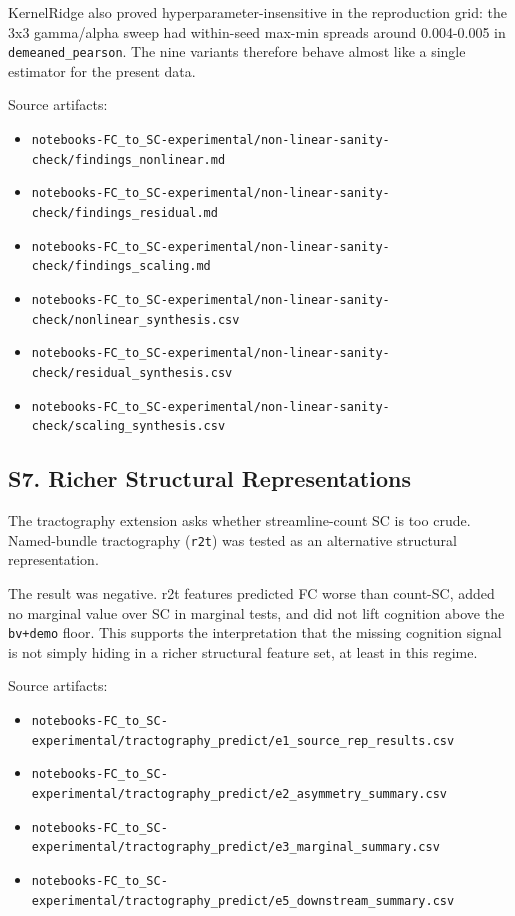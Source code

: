 KernelRidge also proved hyperparameter-insensitive in the reproduction grid: the 3x3 gamma/alpha sweep had within-seed max-min spreads around 0.004-0.005 in \texttt{demeaned\_pearson}. The nine variants therefore behave almost like a single estimator for the present data.

Source artifacts:

\begin{itemize}
\tightlist
\item
  \texttt{notebooks-FC\_to\_SC-experimental/non-linear-sanity-check/findings\_nonlinear.md}
\item
  \texttt{notebooks-FC\_to\_SC-experimental/non-linear-sanity-check/findings\_residual.md}
\item
  \texttt{notebooks-FC\_to\_SC-experimental/non-linear-sanity-check/findings\_scaling.md}
\item
  \texttt{notebooks-FC\_to\_SC-experimental/non-linear-sanity-check/nonlinear\_synthesis.csv}
\item
  \texttt{notebooks-FC\_to\_SC-experimental/non-linear-sanity-check/residual\_synthesis.csv}
\item
  \texttt{notebooks-FC\_to\_SC-experimental/non-linear-sanity-check/scaling\_synthesis.csv}
\end{itemize}

\subsection{S7. Richer Structural Representations}\label{s7-richer-structural-representations}

The tractography extension asks whether streamline-count SC is too crude. Named-bundle tractography (\texttt{r2t}) was tested as an alternative structural representation.

The result was negative. r2t features predicted FC worse than count-SC, added no marginal value over SC in marginal tests, and did not lift cognition above the \texttt{bv+demo} floor. This supports the interpretation that the missing cognition signal is not simply hiding in a richer structural feature set, at least in this regime.

Source artifacts:

\begin{itemize}
\tightlist
\item
  \texttt{notebooks-FC\_to\_SC-experimental/tractography\_predict/e1\_source\_rep\_results.csv}
\item
  \texttt{notebooks-FC\_to\_SC-experimental/tractography\_predict/e2\_asymmetry\_summary.csv}
\item
  \texttt{notebooks-FC\_to\_SC-experimental/tractography\_predict/e3\_marginal\_summary.csv}
\item
  \texttt{notebooks-FC\_to\_SC-experimental/tractography\_predict/e5\_downstream\_summary.csv}
\end{itemize}

